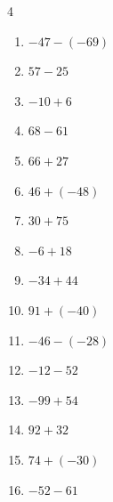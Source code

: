 \begin{multicols}{4}
\begin{enumerate}
  \item $-47-(-69)$

        \phantom{$=22$}

  \item $57-25$

        \phantom{$=32$}

\columnbreak %

  \item $-10+6$

        \phantom{$=-4$}

  \item $68-61$

        \phantom{$=7$}

  \item $66+27$

        \phantom{$=93$}

  \item $46+(-48)$

        \phantom{$=-2$}

  \item $30+75$

        \phantom{$=105$}

  \item $-6+18$

        \phantom{$=12$}

  \item $-34+44$

        \phantom{$=10$}

  \item $91+(-40)$

        \phantom{$=51$}

  \item $-46-(-28)$

        \phantom{$=-18$}

  \item $-12-52$

        \phantom{$=-64$}

  \item $-99+54$

        \phantom{$=-45$}

  \item $92+32$

        \phantom{$=124$}

  \item $74+(-30)$

        \phantom{$=44$}

  \item $-52-61$


\end{enumerate}
\end{multicols}
